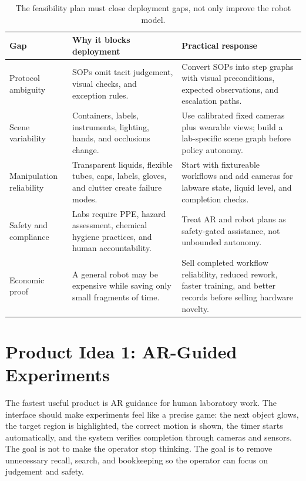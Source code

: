 \documentclass[11pt]{article}
\begin{document}
\begin{table}[htbp]
\centering
\small
\begin{tabularx}{\linewidth}{@{}L{3.1cm}Y Y@{}}
\toprule
\textbf{Gap} & \textbf{Why it blocks deployment} & \textbf{Practical response} \\
\midrule
Protocol ambiguity & SOPs omit tacit judgement, visual checks, and exception rules. & Convert SOPs into step graphs with visual preconditions, expected observations, and escalation paths. \\
Scene variability & Containers, labels, instruments, lighting, hands, and occlusions change. & Use calibrated fixed cameras plus wearable views; build a lab-specific scene graph before policy autonomy. \\
Manipulation reliability & Transparent liquids, flexible tubes, caps, labels, gloves, and clutter create failure modes. & Start with fixtureable workflows and add cameras for labware state, liquid level, and completion checks. \\
Safety and compliance & Labs require PPE, hazard assessment, chemical hygiene practices, and human accountability. & Treat AR and robot plans as safety-gated assistance, not unbounded autonomy. \\
Economic proof & A general robot may be expensive while saving only small fragments of time. & Sell completed workflow reliability, reduced rework, faster training, and better records before selling hardware novelty. \\
\bottomrule
\end{tabularx}
\caption{The feasibility plan must close deployment gaps, not only improve the robot model.}
\label{tab:application-gap}
\end{table}

\section{Product Idea 1: AR-Guided Experiments}

The fastest useful product is AR guidance for human laboratory work. The interface should make experiments feel like a precise game: the next object glows, the target region is highlighted, the correct motion is shown, the timer starts automatically, and the system verifies completion through cameras and sensors. The goal is not to make the operator stop thinking. The goal is to remove unnecessary recall, search, and bookkeeping so the operator can focus on judgement and safety.
\end{document}
